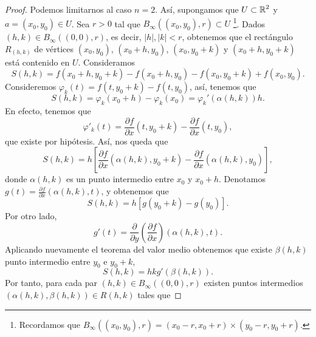 \begin{proof}
Podemos limitarnos al caso $\displaystyle n = 2 $. Así, supongamos que $\displaystyle U \subset \mathbb{R}^{2} $ y $\displaystyle a = \left(x_{0}, y_{0}\right) \in U $. Sea $\displaystyle r > 0 $ tal que $\displaystyle B_{\infty}\left(\left(x_{0}, y_{0}\right), r\right) \subset U $ \footnote{Recordamos que $\displaystyle B_{\infty}\left(\left(x_{0}, y_{0}\right), r\right) = \left(x_{0}-r, x_{0}+r\right) \times \left(y_{0}-r, y_{0}+r\right) $.}. 
Dados $\displaystyle \left(h,k\right) \in B_{\infty}\left(\left(0,0\right), r\right) $, es decir, $\displaystyle \left|h\right|, \left|k\right| < r $, obtenemos que el rectángulo $\displaystyle R_{\left(h,k\right)} $ de vértices $\displaystyle \left(x_{0}, y_{0}\right) $, $\displaystyle \left(x_{0}+h, y_{0}\right) $, $\displaystyle \left(x_{0}, y_{0}+k\right) $ y $\displaystyle \left(x_{0}+h, y_{0}+k\right) $ está contenido en $\displaystyle U $.
Consideramos 
\[S\left(h,k\right) = f\left(x_{0}+h, y_{0}+k\right)-f\left(x_{0}+h, y_{0}\right) - f\left(x_{0}, y_{0}+k\right)+f\left(x_{0},y_{0}\right) .\]
Consideremos $\displaystyle \varphi_{k}\left(t\right)= f\left(t,y_{0}+k\right) -f\left(t,y_{0}\right) $, así, tenemos que
\[S\left(h,k\right)=\varphi_{k}\left(x_{0} + h\right)-\varphi_{k}\left(x_{0}\right) = \varphi_{k}'\left(\alpha\left(h,k\right)\right)h .\]
En efecto, tenemos que 
\[\varphi'_{k}\left(t\right)= \frac{\partial f}{\partial x}\left(t, y_{0}+k\right) - \frac{\partial f}{\partial x}\left(t, y_{0}\right) ,\]
que existe por hipótesis. Así, nos queda que 
\[S\left(h,k\right)= h \left[\frac{\partial f}{\partial x}\left(\alpha\left(h,k\right), y_{0}+k\right) - \frac{\partial f}{\partial x}\left(\alpha\left(h,k\right), y_{0}\right)\right]  ,\]
donde $\displaystyle \alpha\left(h,k\right) $ es un punto intermedio entre $\displaystyle x_{0} $ y $\displaystyle x_{0}+h $. Denotamos $\displaystyle g\left(t\right)= \frac{\partial f}{\partial x}\left(\alpha\left(h,k\right), t\right) $, y obtenemos que 
\[S\left(h,k\right)= h \left[g\left(y_{0}+k\right) -g\left(y_{0}\right)\right]  .\]
Por otro lado, 
\[g'\left(t\right)= \frac{\partial }{\partial y}\left(\frac{\partial f}{\partial x}\right)\left(\alpha\left(h,k\right), t\right) .\]
Aplicando nuevamente el teorema del valor medio obtenemos que existe $\displaystyle \beta\left(h,k\right) $ punto intermedio entre $\displaystyle y_{0} $ e $\displaystyle y_{0}+k $,
\[ S\left(h,k\right)= hkg'\left(\beta\left(h,k\right)\right) .\]
Por tanto, para cada par $\displaystyle \left(h,k\right) \in B_{\infty}\left(\left(0,0\right), r\right) $ existen puntos intermedios $\displaystyle \left(\alpha\left(h,k\right), \beta\left(h,k\right)\right) \in R\left(h,k\right) $ tales que 

\end{proof}
